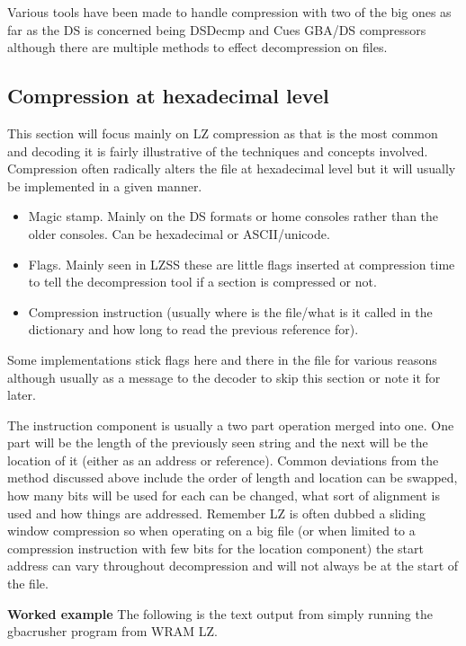 \documentclass[
]{book}
\providecommand{\tightlist}{%
  \setlength{\itemsep}{0pt}\setlength{\parskip}{0pt}}
\begin{document}
Various tools have been made to handle compression with two of the big ones as far as the DS is concerned being DSDecmp and Cues GBA/DS compressors although there are multiple methods to effect decompression on files.

\hypertarget{compression-at-hexadecimal-level}{%
\subsection{Compression at hexadecimal level}\label{compression-at-hexadecimal-level}}

This section will focus mainly on LZ compression as that is the most common and decoding it is fairly illustrative of the techniques and concepts involved. Compression often radically alters the file at hexadecimal level but it will usually be implemented in a given manner.

\begin{itemize}
\tightlist
\item
  Magic stamp. Mainly on the DS formats or home consoles rather than the older consoles. Can be hexadecimal or ASCII/unicode.
\item
  Flags. Mainly seen in LZSS these are little flags inserted at compression time to tell the decompression tool if a section is compressed or not.
\item
  Compression instruction (usually where is the file/what is it called in the dictionary and how long to read the previous reference for).
\end{itemize}

Some implementations stick flags here and there in the file for various reasons although usually as a message to the decoder to skip this section or note it for later.

The instruction component is usually a two part operation merged into one. One part will be the length of the previously seen string and the next will be the location of it (either as an address or reference). Common deviations from the method discussed above include the order of length and location can be swapped, how many bits will be used for each can be changed, what sort of alignment is used and how things are addressed. Remember LZ is often dubbed a sliding window compression so when operating on a big file (or when limited to a compression instruction with few bits for the location component) the start address can vary throughout decompression and will not always be at the start of the file.

\textbf{Worked example} The following is the text output from simply running the gbacrusher program from WRAM LZ.
\end{document}
